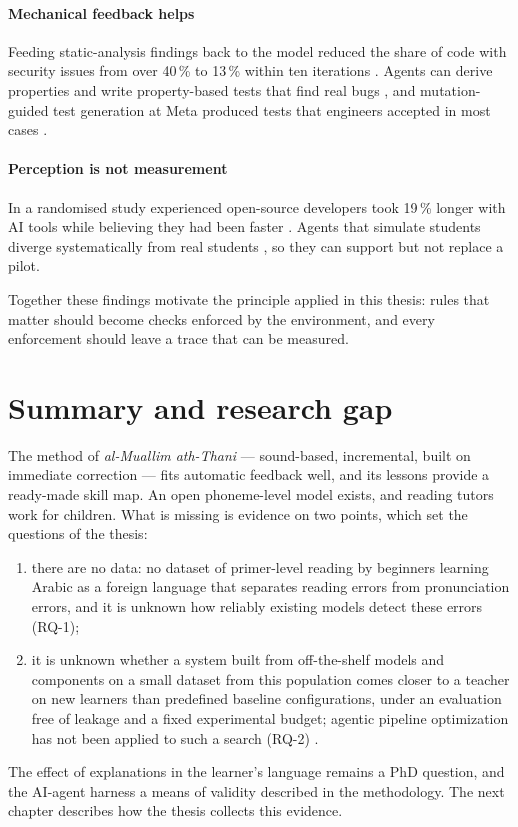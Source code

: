 \paragraph{Mechanical feedback helps} Feeding static-analysis findings back to the model reduced the share
of code with security issues from over 40\,\% to 13\,\% within ten iterations \cite{SRC-078}. Agents can
derive properties and write property-based tests that find real bugs \cite{SRC-080,SRC-081}, and
mutation-guided test generation at Meta produced tests that engineers accepted in most cases
\cite{SRC-079}.

\paragraph{Perception is not measurement} In a randomised study experienced open-source developers took
19\,\% longer with AI tools while believing they had been faster \cite{SRC-030}. Agents that simulate
students diverge systematically from real students \cite{SRC-083,SRC-084,SRC-085}, so they can support but
not replace a pilot.

Together these findings motivate the principle applied in this thesis: rules that matter should become
checks enforced by the environment, and every enforcement should leave a trace that can be measured.

\section{Summary and research gap}\label{sec:lr-gap}

The method of \emph{al-Muallim ath-Thani} --- sound-based, incremental, built on immediate correction ---
fits automatic feedback well, and its lessons provide a ready-made skill map. An open phoneme-level model
exists, and reading tutors work for children. What is missing is evidence on two points, which set the questions of the thesis:
\begin{enumerate}
  \item there are no data: no dataset of primer-level reading by beginners learning Arabic as a foreign language
    that separates reading errors from pronunciation errors, and it is unknown how reliably existing models
    detect these errors (RQ-1);
  \item it is unknown whether a system built from off-the-shelf models and components on a small dataset from
    this population comes closer to a teacher on new learners than predefined baseline configurations, under an evaluation
    free of leakage and a fixed experimental budget; agentic pipeline optimization has not been applied to such a search (RQ-2)
    .
\end{enumerate}
The effect of explanations in the learner's language remains a PhD question, and the AI-agent harness a means of
validity described in the methodology. The next chapter describes how the thesis collects this evidence.
